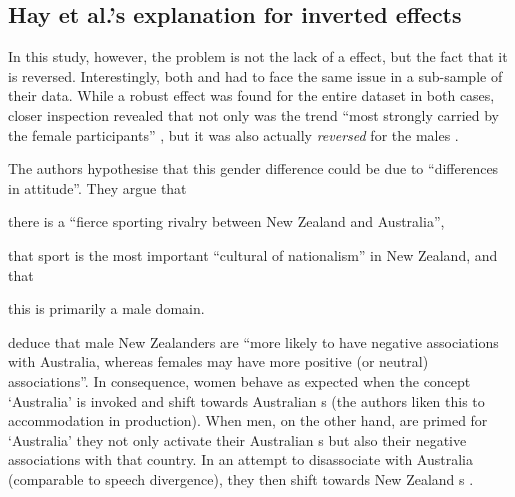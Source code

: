 		\subsection{Hay et al.'s explanation for inverted effects}

In this study, however, the problem is not the lack of a  effect, but the fact that it is reversed.
Interestingly, both \textcite{hayetal2006a} and \textcite{haydrager2010} had to face the same issue in a sub-sample of their data.
While a robust  effect was found for the entire dataset in both cases, closer inspection revealed that not only was the trend ``most strongly carried by the female participants'' \parencite[875]{haydrager2010}, but it was also actually \emph{reversed} for the males \parencite[cf.][876--877]{haydrager2010}.

The authors hypothesise that this gender difference could be due to ``differences in attitude''.
They argue that
	\begin{inparaenum}[(a)]
		\item there is a ``fierce sporting rivalry between New Zealand and Australia'',
		\item that sport is the most important ``cultural  of nationalism'' in New Zealand, and that
		\item this is primarily a male domain.
	\end{inparaenum}
\citeauthor{haydrager2010} deduce that male New Zealanders are ``more likely to have negative associations with Australia, whereas females may have more positive (or neutral) associations''.
In consequence, women behave as expected when the concept `Australia' is invoked and shift towards Australian s (the authors liken this to accommodation in production).
When men, on the other hand, are primed for `Australia' they not only activate their Australian s but also their negative associations with that country.
In an attempt to disassociate with Australia (comparable to speech divergence), they then shift towards New Zealand s \parencite[cf.][884--885]{haydrager2010}.

